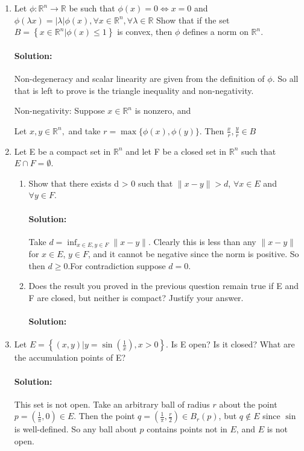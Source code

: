 \documentclass{article}
\begin{document}
\begin{enumerate} 

\item Let $\phi : \mathbb{R}^n \to \mathbb{R}$ be such that $\phi(x) = 0 \Leftrightarrow x = 0$ and $\phi(\lambda x) = |\lambda| \phi(x), \forall x \in \mathbb{R}^n, \forall \lambda \in \mathbb{R}$  Show that if the set $B = \left\{x \in \mathbb{R}^n | \phi(x) \leq 1 \right\}$ is convex, then $\phi$ defines a norm on $\mathbb{R}^n$. 
\paragraph{Solution: }Non-degeneracy and scalar linearity are given from the definition of $\phi$. So all that is left to prove is the triangle inequality and non-negativity.

Non-negativity: Suppose $x\in \mathbb{R}^{n}$ is nonzero, and 

Let $x,y\in \mathbb{R}^{n},$ and take $r=\max \{\phi(x),\phi(y)\} $. Then $\frac{x}{r},\frac{y}{r}\in B$ 
\item Let E be a compact set in $\mathbb{R}^n$ and let F be a closed set in $\mathbb{R}^n$ such that $E \cap F = \emptyset$.  

\begin{enumerate}[label= (\alph*)] 
    \item Show that there exists d > 0 such that $\|x - y\| > d$, $\forall x \in E$ and $\forall y \in F$.  
        \paragraph{Solution: }Take $d=\inf_{x\in E,y\in F}\|x-y\|$. Clearly this is less than any $\|x-y\|$ for $x\in E$, $y\in F$, and it cannot be negative since the norm is positive. So then $d\geq 0$.For contradiction suppose $d=0$.
    \item  Does the result you proved in the previous question remain true if E and F are closed, but neither is compact? Justify your answer.  
        \paragraph{Solution: }
\end{enumerate}
\item Let $E = \left\{(x,y) | y = \sin\left( \frac{1}{x} \right), x > 0 \right\}$. Is E open? Is it closed? What are the accumulation points of E?  

    \paragraph{Solution: }This set is not open. Take an arbitrary ball of radius $r$ about the point $p=\left(\frac{1}{\pi},0\right)\in E$. Then the point $q=\left(\frac{1}{\pi},\frac{r}{2}\right)\in B_r(p)$, but $q\not\in E$ since $\sin$ is well-defined. So any ball about $p$ contains points not in $E$, and $E$ is not open.


\end{enumerate}
\end{document}
